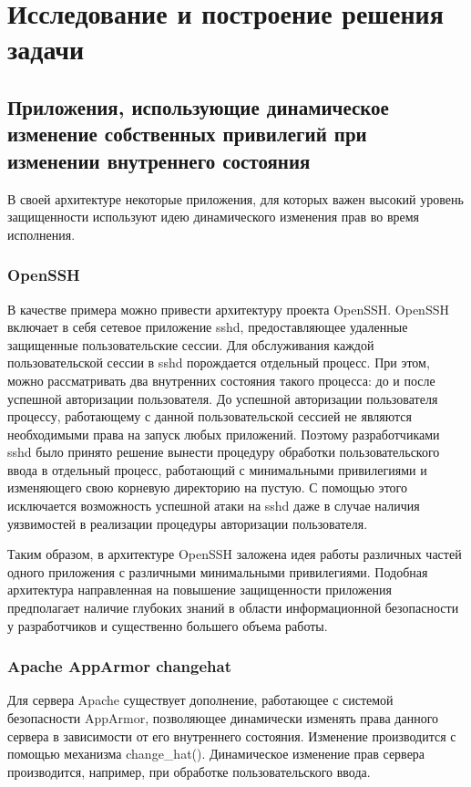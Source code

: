 \section{Исследование и построение решения задачи}
\label{issled}

\subsection{Приложения, использующие динамическое изменение
            собственных привилегий при изменении внутреннего состояния}

В своей архитектуре некоторые приложения, 
для которых важен высокий уровень защищенности 
используют идею динамического изменения прав
во время исполнения.

\subsubsection{OpenSSH}

В качестве примера можно 
привести архитектуру проекта OpenSSH. OpenSSH
включает в себя сетевое приложение sshd, 
предоставляющее удаленные защищенные пользовательские 
сессии. Для обслуживания каждой пользовательской сессии
в sshd порождается отдельный процесс. При этом, 
можно рассматривать два внутренних состояния такого 
процесса: до и после успешной авторизации пользователя.
До успешной авторизации пользователя процессу, работающему 
с данной пользовательской сессией не являются необходимыми 
права на запуск любых приложений. Поэтому разработчиками 
sshd было принято решение вынести процедуру обработки 
пользовательского ввода в отдельный процесс, 
работающий с минимальными привилегиями и изменяющего 
свою корневую директорию на пустую. С помощью этого 
исключается возможность успешной атаки на sshd даже 
в случае наличия уязвимостей в реализации процедуры 
авторизации пользователя. 

Таким образом, в архитектуре OpenSSH заложена 
идея работы различных частей одного приложения 
с различными минимальными привилегиями. Подобная 
архитектура направленная на повышение защищенности 
приложения предполагает наличие глубоких знаний 
в области информационной безопасности у разработчиков
и существенно большего объема работы.

\subsubsection{Apache AppArmor changehat}

Для сервера Apache существует дополнение, работающее
с системой безопасности AppArmor, позволяющее
динамически изменять права данного сервера в зависимости
от его внутреннего состояния. Изменение производится с
помощью механизма change\_hat(). Динамическое изменение
прав сервера производится, например, при обработке
пользовательского ввода.

